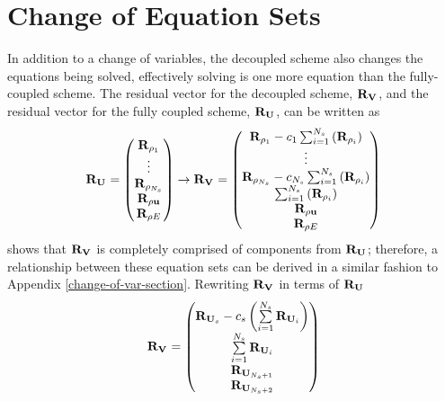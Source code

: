 \chapter{Change of Equation Sets}
\label{sec:change-of-equations}

In addition to a change of variables, the decoupled scheme also changes the
equations being solved, effectively solving is one more equation than the
fully-coupled scheme.  The residual vector for the decoupled scheme, $\mathbf R_{{\mathbf V}_{}}$,
and the residual vector for the fully coupled scheme, $\mathbf R_{{\mathbf U}_{}}$, can be written as
\begin{equation}
  \mathbf R_{{\mathbf U}_{}} =
  \begin{pmatrix}
    \mathbf R_{\rho_1} \\
    \vdots \\
    \mathbf R_{\rho_{N_s}} \\
    \mathbf R_{\rho \mathbf u} \\
    \mathbf R_{\rho E}
  \end{pmatrix}
  \rightarrow
  \mathbf R_{{\mathbf V}_{}} =
  \begin{pmatrix}
    \mathbf R_{\rho_1} - c_1 \sum_{i=1}^{N_s}\left(\mathbf R_{\rho_i}\right) \\
    \vdots \\
    \mathbf R_{\rho_{N_s}} - c_{N_s} \sum_{i=1}^{N_s}\left(\mathbf R_{\rho_i}\right) \\
    \sum_{i=1}^{N_s}\left(\mathbf R_{\rho_i}\right) \\
    \mathbf R_{\rho \mathbf u} \\
    \mathbf R_{\rho E}
  \end{pmatrix}
  \label{fc-dc-res}
\end{equation}
 shows that $\mathbf R_{{\mathbf V}_{}}$ is completely comprised of components from
$\mathbf R_{{\mathbf U}_{}}$; therefore, a relationship between these equation sets can be derived in
a similar fashion to Appendix \ref{change-of-var-section}.  Rewriting $\mathbf R_{{\mathbf V}_{}}$ in
terms of $\mathbf R_{{\mathbf U}_{}}$
\begin{equation}
  \mathbf R_{{\mathbf V}_{}} =
  \begin{pmatrix}
    \mathbf R_{{\mathbf U}_{s}} - c_s \left( \sum\limits_{i=1}^{N_s}{\mathbf R_{{\mathbf U}_{i}}} \right) \\
    \sum\limits_{i=1}^{N_s}{\mathbf R_{{\mathbf U}_{i}}} \\
    \mathbf R_{{\mathbf U}_{N_s + 1}} \\
    \mathbf R_{{\mathbf U}_{N_s + 2}}
  \end{pmatrix}
  \label{ru-to-rv}
\end{equation}
